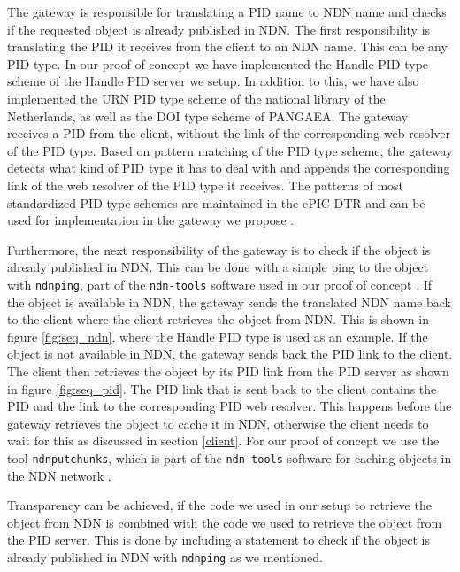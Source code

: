 The gateway is responsible for translating a PID name to NDN name and checks if the requested object is already published in NDN. 
The first responsibility is translating the PID it receives from the client to an NDN name. This can be any PID type. In our proof of concept we have implemented the Handle PID type scheme of the Handle PID server we setup. In addition to this, we have also implemented the URN PID type scheme of the national library of the Netherlands, as well as the DOI type scheme of PANGAEA. The gateway receives a PID from the client, without the link of the corresponding web resolver of the PID type. Based on pattern matching of the PID type scheme, the gateway detects what kind of PID type it has to deal with and appends the corresponding link of the web resolver of the PID type it receives. 
The patterns of most standardized PID type schemes are maintained in the ePIC DTR and can be used for implementation in the gateway we propose \cite{dtr}. 

Furthermore, the next responsibility of the gateway is to check if the object is already published in NDN. This can be done with a simple ping to the object with \texttt{ndnping}, part of the \texttt{ndn-tools} software used in our proof of concept \cite{ndn-tools}. 
If the object is available in NDN, the gateway sends the translated NDN name back to the client where the client retrieves the object from NDN. This is shown in figure \ref{fig:seq_ndn}, where the Handle PID type is used as an example. If the object is not available in NDN, the gateway sends back the PID link to the client. The client then retrieves the object by its PID link from the PID server as shown in figure \ref{fig:seq_pid}. The PID link that is sent back to the client contains the PID and the link to the corresponding PID web resolver. This happens before the gateway retrieves the object to cache it in NDN, otherwise the client needs to wait for this as discussed in section \ref{client}. For our proof of concept we use the tool \texttt{ndnputchunks}, which is part of the \texttt{ndn-tools} software for caching objects in the NDN network \cite{ndn-tools}.

Transparency can be achieved, if the code we used in our setup to retrieve the object from NDN is combined with the code we used to retrieve the object from the PID server. This is done by including a statement to check if the object is already published in NDN with \texttt{ndnping} as we mentioned. 

